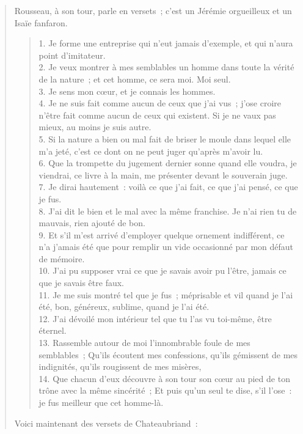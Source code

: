 \documentclass[french,twoside]{book} %
\begin{document}
\begin{verse}
\noindent Rousseau, à son tour, parle en versets ; c’est un Jérémie orgueilleux et un Isaïe fanfaron.\par


\begin{verse}
1. Je forme une entreprise qui n’eut jamais d’exemple, et qui n’aura point d’imitateur.\\
2. Je veux montrer à mes semblables un homme dans toute la vérité de la nature ; et cet homme, ce sera moi. Moi seul.\\
3. Je sens mon cœur, et je connais les hommes.\\
4. Je ne suis fait comme aucun de ceux que j’ai vus ; j’ose croire n’être fait comme aucun de ceux qui existent. Si je ne vaux pas mieux, au moins je suis autre.\\
5. Si la nature a bien ou mal fait de briser le moule dans lequel elle m’a jeté, c’est ce dont on ne peut juger qu’après m’avoir lu.\\
6. Que la trompette du jugement dernier sonne quand elle voudra, je viendrai, ce livre à la main, me présenter devant le souverain juge.\\
7. Je dirai hautement : voilà ce que j’ai fait, ce que j’ai pensé, ce que je fus.\\
8. J’ai dit le bien et le mal avec la même franchise. Je n’ai rien tu de mauvais, rien ajouté de bon.\\
9. Et s’il m’est arrivé d’employer quelque ornement indifférent, ce n’a j’amais été que pour remplir un vide occasionné par mon défaut de mémoire.\\
10. J’ai pu supposer vrai ce que je savais avoir pu l’être, jamais ce que je savais être faux.\\
11. Je me suis montré tel que je fus ; méprisable et vil quand je l’ai été, bon, généreux, sublime, quand je l’ai été.\\
12. J’ai dévoilé mon intérieur tel que tu l’as vu toi-même, être éternel.\\
13. Rassemble autour de moi l’innombrable foule de mes semblables ; Qu’ils écoutent mes confessions, qu’ils gémissent de mes indignités, qu’ils rougissent de mes misères,\\
14. Que chacun d’eux découvre à son tour son cœur au pied de ton trône avec la même sincérité ; Et puis qu’un seul te dise, s’il l’ose : je fus meilleur que cet homme-là.\\
\end{verse}

\noindent Voici maintenant des versets de Chateaubriand :\par



\end{verse}
\end{document}
